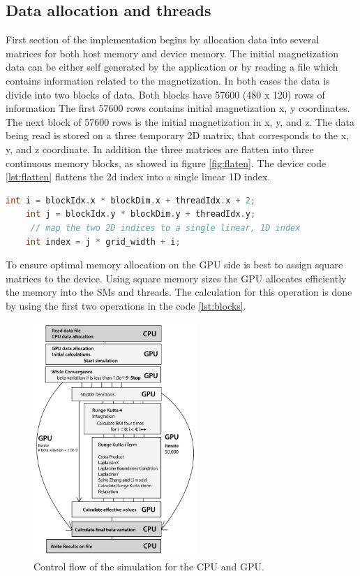 \subsection{Data allocation and threads}

First section of the implementation begins by allocation data into several matrices for both host memory and device memory. The initial magnetization data can be either self generated by the application or by reading a file which contains information related to the magnetization. In both cases the data is divide into two blocks of data. Both blocks have 57600 (480 x 120) rows of information The first 57600 rows contains initial magnetization x, y coordinates. The next block of 57600 rows is the initial magnetization in x, y, and z. The data being read is stored on a three temporary 2D matrix, that corresponds to the x, y, and z coordinate. In addition the three matrices are flatten into three continuous memory blocks, as showed in figure \ref{fig:flaten}. The device code \ref{lst:flatten} flattens the 2d index into a single linear 1D index.

\begin{lstlisting}[language=C++, label={lst:flatten}, caption={Kernel Flatten from a 2 value index to a single value index.}]	
    int i = blockIdx.x * blockDim.x + threadIdx.x + 2;
    int j = blockIdx.y * blockDim.y + threadIdx.y;
     // map the two 2D indices to a single linear, 1D index
    int index = j * grid_width + i; 
\end{lstlisting}


To ensure optimal memory allocation on the GPU side is best to assign square matrices to the device. Using square memory sizes the GPU allocates efficiently the memory into the SMs and threads. The calculation for this operation is done by using the first two operations in the code \ref{lst:blocks}.

\begin{figure}[htbp]
	\centering
		\includegraphics[width=0.55\textwidth]{Figures/flow.png}
		\smallskip
	\caption[Control flow]{Control flow of the simulation for the CPU and GPU.}
	\label{fig:flow}
\end{figure}


